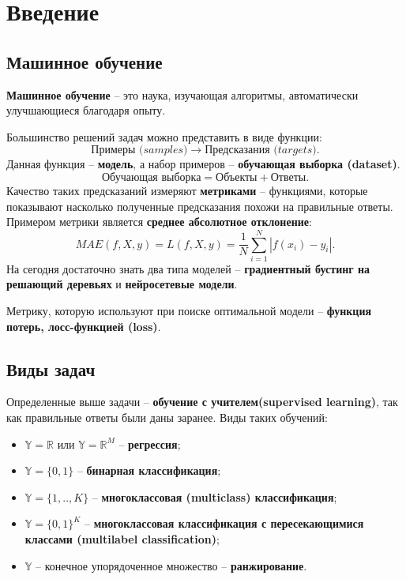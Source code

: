\documentclass[a4paper,10pt, openany]{book} %
\begin{document}
	
	\tableofcontents %
	
	\newpage
	
	\chapter{Введение}
	
	\section{Машинное обучение}
	
	\textbf{Машинное обучение} -- это наука, изучающая алгоритмы, автоматически улучшающиеся благодаря опыту.
	
	Большинство решений задач можно представить в виде функции:
	\begin{equation*}
		\textit{Примеры (samples)} \rightarrow \textit{Предсказания (targets)}.
	\end{equation*}
	Данная функция -- \textbf{модель}, а набор примеров -- \textbf{обучающая выборка (dataset)}.
	\begin{equation*}
		\text{Обучающая выборка} = \text{Объекты} + \text{Ответы}.
	\end{equation*}
	Качество таких предсказаний измеряют \textbf{метриками} -- функциями, которые показывают насколько полученные предсказания похожи на правильные ответы. Примером метрики является \textbf{среднее абсолютное отклонение}:
	\begin{equation*}
		MAE(f,X,y) = L(f,X,y) = \frac{1}{N}\sum_{i=1}^{N}|f(x_i) - y_i|. 
	\end{equation*}
	На сегодня достаточно знать два типа моделей -- \textbf{градиентный бустинг на решающий деревьях} и \textbf{нейросетевые модели}.
	
	Метрику, которую используют при поиске оптимальной модели -- \textbf{функция потерь, лосс-функцией (loss)}.
	
	\section{Виды задач}
	
	Определенные выше задачи -- \textbf{обучение с учителем(supervised learning)}, так как правильные ответы были даны заранее. Виды таких обучений: 
	\begin{itemize}
		\item $\mathbb{Y} = \mathbb{R}$ или $\mathbb{Y} = \mathbb{R}^M$ -- \textbf{регрессия};
		\item $\mathbb{Y} = \{0,1\}$ -- \textbf{бинарная классификация};
		\item $\mathbb{Y} = \{1,..,K\}$ -- \textbf{многоклассовая (multiclass) классификация};
		\item $\mathbb{Y} = \{0,1\}^K$ -- \textbf{многоклассовая классификация с пересекающимися классами (multilabel classification)};
		\item $\mathbb{Y}$ -- конечное упорядоченное множество -- \textbf{ранжирование}.
	\end{itemize}
	
\end{document}
